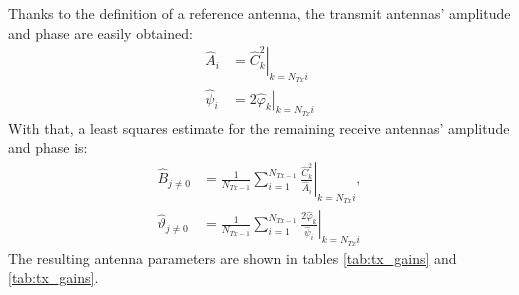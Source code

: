 Thanks to the definition of a reference antenna,
the transmit antennas' amplitude and phase are easily obtained:
\begin{align}
    \hat A_i    & = \left.\hat C_k^2 \right|_{k=N_{Tx}i}       \\
    \hat \psi_i & = \left.2\hat \varphi_k \right|_{k=N_{Tx}i}
\end{align}
With that, a least squares estimate for the remaining receive antennas' amplitude and phase is:
\begin{align}
    \hat B_{j\neq0}         & = \frac{1}{N_{Tx-1}} \sum_{i=1}^{N_{Tx-1}} \left. \frac{\hat C_k^2}{\hat A_i} \right|_{k=N_{Tx}i},         \\
    \hat \vartheta_{j\neq0} & = \frac{1}{N_{Tx-1}} \sum_{i=1}^{N_{Tx-1}} \left. \frac{2\hat \varphi_k}{\hat \psi_i} \right|_{k=N_{Tx}i}
\end{align}
The resulting antenna parameters are shown in tables \ref{tab:tx_gains} and \ref{tab:tx_gains}.
